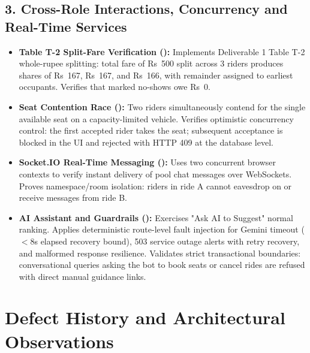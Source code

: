 \documentclass[10pt]{article}
\begin{document}
\subsection{3. Cross-Role Interactions, Concurrency and Real-Time Services}
\begin{itemize}
  \item \textbf{Table T-2 Split-Fare Verification ():} Implements Deliverable 1 Table T-2 whole-rupee splitting: total fare of Rs~500 split across 3 riders produces shares of Rs~167, Rs~167, and Rs~166, with remainder assigned to earliest occupants. Verifies that marked no-shows owe Rs~0.
  \item \textbf{Seat Contention Race ():} Two riders simultaneously contend for the single available seat on a capacity-limited vehicle. Verifies optimistic concurrency control: the first accepted rider takes the seat; subsequent acceptance is blocked in the UI and rejected with HTTP 409 at the database level.
  \item \textbf{Socket.IO Real-Time Messaging ():} Uses two concurrent browser contexts to verify instant delivery of pool chat messages over WebSockets. Proves namespace/room isolation: riders in ride A cannot eavesdrop on or receive messages from ride B.
  \item \textbf{AI Assistant and Guardrails ():} Exercises "Ask AI to Suggest" normal ranking. Applies deterministic route-level fault injection for Gemini timeout ($<8$s elapsed recovery bound), 503 service outage alerts with retry recovery, and malformed response resilience. Validates strict transactional boundaries: conversational queries asking the bot to book seats or cancel rides are refused with direct manual guidance links.
\end{itemize}

\section{Defect History and Architectural Observations}
\end{document}
